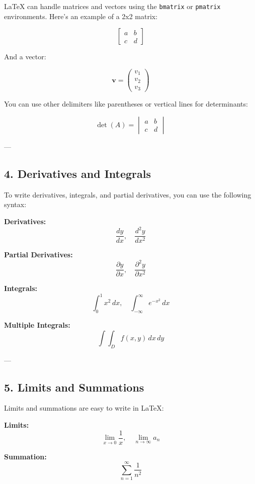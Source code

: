 \documentclass{article}
\begin{document}
LaTeX can handle matrices and vectors using the \texttt{bmatrix} or \texttt{pmatrix} environments. Here's an example of a 2x2 matrix:

\[
\begin{bmatrix}
    a & b \\
    c & d
\end{bmatrix}
\]

And a vector:

\[
\mathbf{v} = \begin{pmatrix}
    v_1 \\
    v_2 \\
    v_3
\end{pmatrix}
\]

You can use other delimiters like parentheses or vertical lines for determinants:

\[
\det(A) = \begin{vmatrix}
    a & b \\
    c & d
\end{vmatrix}
\]

---

\subsection*{4. Derivatives and Integrals}

To write derivatives, integrals, and partial derivatives, you can use the following syntax:

\textbf{Derivatives:}
\[
\frac{dy}{dx}, \quad \frac{d^2y}{dx^2}
\]

\textbf{Partial Derivatives:}
\[
\frac{\partial y}{\partial x}, \quad \frac{\partial^2 y}{\partial x^2}
\]

\textbf{Integrals:}
\[
\int_0^1 x^2 \, dx, \quad \int_{-\infty}^{\infty} e^{-x^2} \, dx
\]

\textbf{Multiple Integrals:}
\[
\int\!\!\!\int_D f(x,y) \, dx \, dy
\]

---

\subsection*{5. Limits and Summations}

Limits and summations are easy to write in LaTeX:

\textbf{Limits:}
\[
\lim_{x \to 0} \frac{1}{x}, \quad \lim_{n \to \infty} a_n
\]

\textbf{Summation:}
\[
\sum_{n=1}^{\infty} \frac{1}{n^2}
\]
\end{document}
